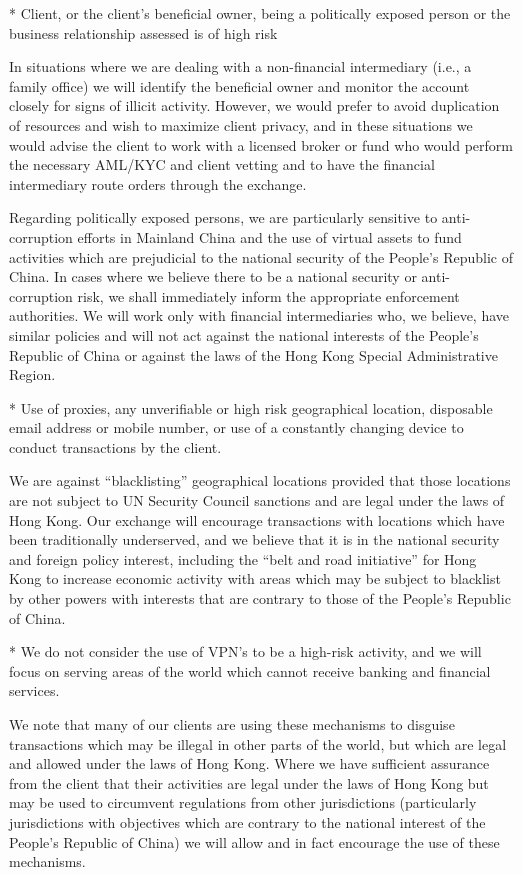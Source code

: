 * Client, or the client’s beneficial owner, being a politically
exposed person or the business relationship assessed is of high risk

In situations where we are dealing with a non-financial intermediary
(i.e., a family office) we will identify the beneficial owner and
monitor the account closely for signs of illicit activity.  However,
we would prefer to avoid duplication of resources and wish to maximize
client privacy, and in these situations we would advise the client to
work with a licensed broker or fund who would perform the necessary
AML/KYC and client vetting and to have the financial intermediary
route orders through the exchange.

Regarding politically exposed persons, we are particularly
sensitive to anti-corruption efforts in Mainland China and the use of
virtual assets to fund activities which are prejudicial to the
national security of the People's Republic of China.  In cases where
we believe there to be a national security or anti-corruption risk, we
shall immediately inform the appropriate enforcement authorities.  We
will work only with financial intermediaries who, we believe, have
similar policies and will not act against the national interests of
the People's Republic of China or against the laws of the Hong Kong
Special Administrative Region.

* Use of proxies, any unverifiable or high risk geographical location,
disposable email address or mobile number, or use of a constantly
changing device to conduct transactions by the client.

We are against ``blacklisting'' geographical locations provided that
those locations are not subject to UN Security Council sanctions and
are legal under the laws of Hong Kong.  Our exchange will encourage
transactions with locations which have been traditionally underserved,
and we believe that it is in the national security and foreign policy
interest, including the ``belt and road initiative'' for Hong Kong to
increase economic activity with areas which may be subject to
blacklist by other powers with interests that are contrary to those of
the People's Republic of China.

* We do not consider the use of VPN's to be a high-risk activity,
and we will focus on serving areas of the world which cannot
receive banking and financial services.

We note that many of our clients are using these mechanisms to
disguise transactions which may be illegal in other parts of the
world, but which are legal and allowed under the laws of Hong Kong.
Where we have sufficient assurance from the client that their
activities are legal under the laws of Hong Kong but may be used to
circumvent regulations from other jurisdictions (particularly
jurisdictions with objectives which are contrary to the national
interest of the People's Republic of China) we will allow and in fact
encourage the use of these mechanisms.


